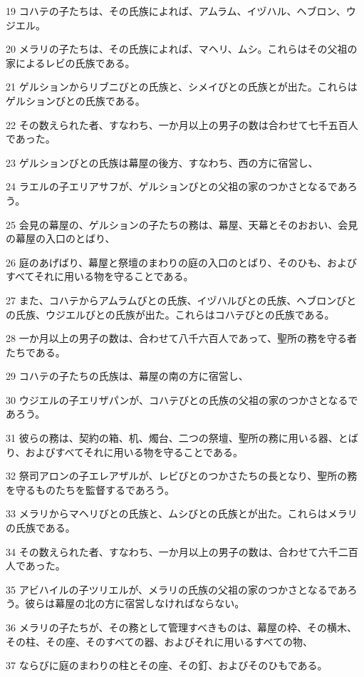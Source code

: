 \par 19 コハテの子たちは、その氏族によれば、アムラム、イヅハル、ヘブロン、ウジエル。
\par 20 メラリの子たちは、その氏族によれば、マヘリ、ムシ。これらはその父祖の家によるレビの氏族である。
\par 21 ゲルションからリブニびとの氏族と、シメイびとの氏族とが出た。これらはゲルションびとの氏族である。
\par 22 その数えられた者、すなわち、一か月以上の男子の数は合わせて七千五百人であった。
\par 23 ゲルションびとの氏族は幕屋の後方、すなわち、西の方に宿営し、
\par 24 ラエルの子エリアサフが、ゲルションびとの父祖の家のつかさとなるであろう。
\par 25 会見の幕屋の、ゲルションの子たちの務は、幕屋、天幕とそのおおい、会見の幕屋の入口のとばり、
\par 26 庭のあげばり、幕屋と祭壇のまわりの庭の入口のとばり、そのひも、およびすべてそれに用いる物を守ることである。
\par 27 また、コハテからアムラムびとの氏族、イヅハルびとの氏族、ヘブロンびとの氏族、ウジエルびとの氏族が出た。これらはコハテびとの氏族である。
\par 28 一か月以上の男子の数は、合わせて八千六百人であって、聖所の務を守る者たちである。
\par 29 コハテの子たちの氏族は、幕屋の南の方に宿営し、
\par 30 ウジエルの子エリザパンが、コハテびとの氏族の父祖の家のつかさとなるであろう。
\par 31 彼らの務は、契約の箱、机、燭台、二つの祭壇、聖所の務に用いる器、とばり、およびすべてそれに用いる物を守ることである。
\par 32 祭司アロンの子エレアザルが、レビびとのつかさたちの長となり、聖所の務を守るものたちを監督するであろう。
\par 33 メラリからマヘリびとの氏族と、ムシびとの氏族とが出た。これらはメラリの氏族である。
\par 34 その数えられた者、すなわち、一か月以上の男子の数は、合わせて六千二百人であった。
\par 35 アビハイルの子ツリエルが、メラリの氏族の父祖の家のつかさとなるであろう。彼らは幕屋の北の方に宿営しなければならない。
\par 36 メラリの子たちが、その務として管理すべきものは、幕屋の枠、その横木、その柱、その座、そのすべての器、およびそれに用いるすべての物、
\par 37 ならびに庭のまわりの柱とその座、その釘、およびそのひもである。

